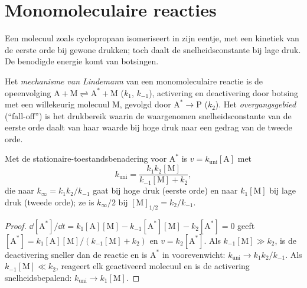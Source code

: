 \section{Monomoleculaire reacties}

Een molecuul zoals cyclopropaan isomeriseert in zijn eentje, met een
kinetiek van de eerste orde bij gewone drukken; toch daalt de
snelheidsconstante bij lage druk. De benodigde energie komt van botsingen.

\begin{definition}\label{def:b3:complex-kinetics:lindemann}
Het \emph{mechanisme van Lindemann} van
een monomoleculaire reactie is de opeenvolging $\mathrm{A + M \rightleftharpoons A^* + M}$ ($k_1$, $k_{-1}$),
activering en deactivering door botsing met een willekeurig molecuul M,
gevolgd door $\mathrm{A^* \to P}$ ($k_2$). Het
\emph{overgangsgebied} (``fall-off'') is het
drukbereik waarin de waargenomen snelheidsconstante van de eerste orde
daalt van haar waarde bij hoge druk naar een gedrag van de tweede orde.
\end{definition}

\begin{theorem}\label{thm:b3:complex-kinetics:lindemann}
Met de stationaire-toestandsbenadering voor $\mathrm{A^*}$ is $v = k_{\mathrm{uni}}[\mathrm A]$ met
\[
  k_{\mathrm{uni}} = \frac{k_1k_2[\mathrm M]}{k_{-1}[\mathrm M] + k_2},
\]
die naar $k_\infty = k_1k_2/k_{-1}$ gaat bij hoge druk (eerste orde) en naar $k_1[\mathrm M]$ bij
lage druk (tweede orde); ze is $k_\infty/2$ bij $[\mathrm M]_{1/2} = k_2/k_{-1}$.
\end{theorem}

\begin{proof}
$\dd[\mathrm{A^*}]/\dd t = k_1[\mathrm A][\mathrm M] - k_{-1}[\mathrm{A^*}][\mathrm M] - k_2[\mathrm{A^*}] = 0$ geeft $[\mathrm{A^*}] =
k_1[\mathrm A][\mathrm M]/(k_{-1}[\mathrm M] + k_2)$ en $v = k_2[\mathrm{A^*}]$. Als $k_{-1}[\mathrm M] \gg k_2$, is de
deactivering sneller dan de reactie en is $\mathrm{A^*}$ in voorevenwicht: $k_{\mathrm{uni}} \to k_1k_2/k_{-1}$. Als $k_{-1}[\mathrm M]
\ll k_2$, reageert elk geactiveerd molecuul en is de activering
snelheidsbepalend:
$k_{\mathrm{uni}} \to k_1[\mathrm M]$.
\end{proof}

